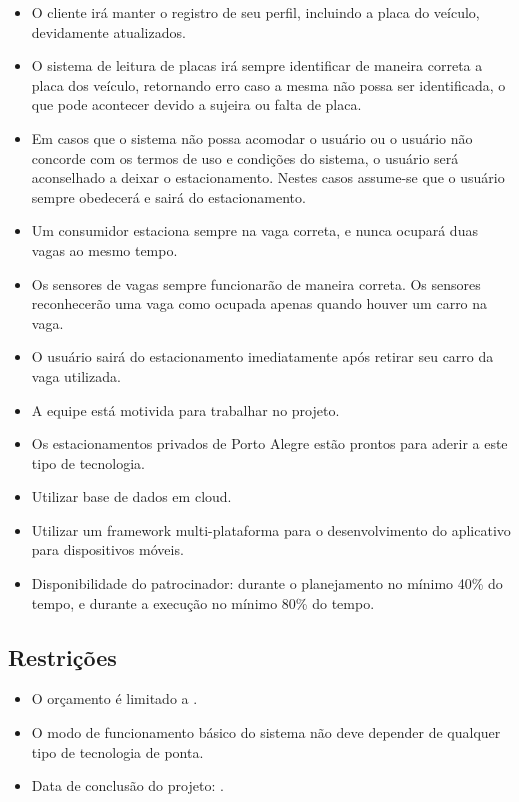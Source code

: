 \begin{itemize}
	\item O cliente irá manter o registro de seu perfil, incluindo a placa do veículo, devidamente atualizados.
    \item O sistema de leitura de placas irá sempre identificar de maneira correta a placa dos veículo, retornando erro caso a mesma não possa ser identificada, o que pode acontecer devido a sujeira ou falta de placa.
    \item Em casos que o sistema não possa acomodar o usuário ou o usuário não concorde com os termos de uso e condições do sistema, o usuário será aconselhado a deixar o estacionamento. Nestes casos assume-se que o usuário sempre obedecerá e sairá do estacionamento.
    \item Um consumidor estaciona sempre na vaga correta, e nunca ocupará duas vagas ao mesmo tempo.
    \item Os sensores de vagas sempre funcionarão de maneira correta. Os sensores reconhecerão uma vaga como ocupada apenas quando houver um carro na vaga.
    \item O usuário sairá do estacionamento imediatamente após retirar seu carro da vaga utilizada.
    \item A equipe está motivida para trabalhar no projeto.
	\item Os estacionamentos privados de Porto Alegre estão prontos para aderir a este tipo de tecnologia.
	\item Utilizar base de dados em cloud.
	\item Utilizar um framework multi-plataforma para o desenvolvimento do aplicativo para dispositivos móveis.
	\item Disponibilidade do patrocinador: durante o planejamento no mínimo 40\% do tempo, e durante a execução no mínimo 80\% do tempo.
\end{itemize}

\subsection{Restrições}

\begin{itemize}
	\item O orçamento é limitado a \maximumBudget.
	\item O modo de funcionamento básico do sistema não deve depender de qualquer tipo de tecnologia de ponta. 
	\item Data de conclusão do projeto: \maximumDeadline.
\end{itemize}

